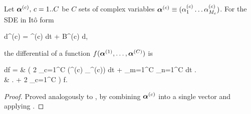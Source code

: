 \begin{theorem}
\label{thm:fpe-sde:ito-formula:mc-ito-f}
	Let $\boldsymbol{\alpha}^{(c)},\, c = 1..C$ be $C$ sets of complex variables $\boldsymbol{\alpha}^{(c)} \equiv (\alpha_1^{(c)} \ldots \alpha_{M_c}^{(c)})$.
	For the SDE in It\^{o} form
	\begin{eqn*}
		d\balpha^{(c)} = \avec^{(c)} dt + B^{(c)} d\Zvec,
	\end{eqn*}
	the differential of a function $f(\boldsymbol{\alpha}^{(1)}, \ldots, \boldsymbol{\alpha}^{(C)})$ is
	\begin{eqn*}
		df ={} & \left(
			2 \sum_{c=1}^C \Real (\avec^{(c)} \cdot \bpartial_{\balpha^{(c)}}) dt
			+ \sum_{m=1}^C \sum_{n=1}^C  dt \right. \\
		& \left. + 2 \sum_{c=1}^C \Real \Trace{ B^{(c)} d\Zvec \bpartial_{\balpha^{(c)}}^T }
		\right) f.
	\end{eqn*}
\end{theorem}
\begin{proof}
Proved analogously to , by combining $\boldsymbol{\alpha}^{(c)}$ into a single vector	and applying .
\end{proof}

